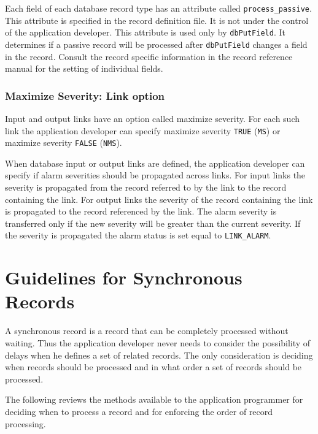 Each field of each database record type has an attribute called \verb|process_passive|. This attribute is specified in the  
record definition file. It is not under the control of the application developer. This attribute is used only by \verb|dbPutField|. 
It determines if a passive record will be processed after \verb|dbPutField| changes a field in the record. Consult the record 
specific information in the record reference manual for the setting of individual fields.

\subsubsection{Maximize Severity: Link option}

Input and output links have an option called maximize severity. For each such link the application developer can specify 
maximize severity \verb|TRUE| (\verb|MS|) or maximize severity \verb|FALSE| (\verb|NMS|). 

When database input or output links are defined, the application developer can specify if alarm severities should be 
propagated across links. For input links the severity is propagated from the record referred to by the link to the record 
containing the link. For output links the severity of the record containing the link is propagated to the record referenced by 
the link. The alarm severity is transferred only if the new severity will be greater than the current severity. If the severity 
is propagated the alarm status is set equal to \verb|LINK_ALARM|.

\section{Guidelines for Synchronous Records}

A synchronous record is a record that can be completely processed without waiting. Thus the application developer never 
needs to consider the possibility of delays when he defines a set of related records. The only consideration is deciding 
when records should be processed and in what order a set of records should be processed.

The following reviews the methods available to the application programmer for deciding when to process a record and for 
enforcing the order of record processing.

